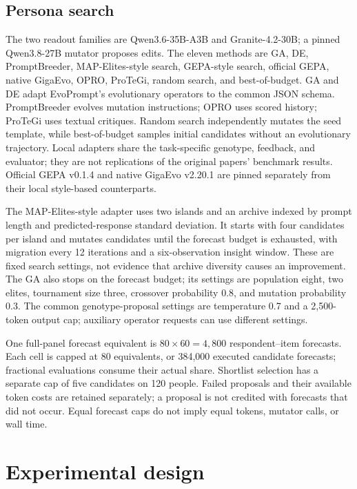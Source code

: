 \documentclass[sigconf,anonymous]{aamas}
\begin{document}
\subsection{Persona search}\label{sec:search}
The two readout families are Qwen3.6-35B-A3B and Granite-4.2-30B; a pinned
Qwen3.8-27B mutator proposes edits. The eleven methods are GA, DE,
PromptBreeder, MAP-Elites-style search, GEPA-style search, official GEPA,
native GigaEvo, OPRO, ProTeGi, random search, and best-of-budget.
GA and DE adapt EvoPrompt's evolutionary operators to the common JSON
schema. PromptBreeder evolves mutation instructions; OPRO uses scored
history; ProTeGi uses textual critiques. Random search independently mutates
the seed template, while best-of-budget samples initial candidates without
an evolutionary trajectory. Local adapters share the task-specific genotype,
feedback, and evaluator; they are not replications of the original papers'
benchmark results. Official GEPA v0.1.4 and native GigaEvo v2.20.1 are
pinned separately from their local style-based counterparts.

The MAP-Elites-style adapter uses two islands and an archive indexed by
prompt length and predicted-response standard deviation. It starts with four
candidates per island and mutates candidates until the forecast budget is
exhausted, with migration every 12 iterations and a six-observation insight
window. These are fixed search settings, not evidence that archive diversity
causes an improvement. The GA also stops on the forecast budget; its settings
are population eight, two elites, tournament
size three, crossover probability 0.8, and mutation probability 0.3.
The common genotype-proposal settings are temperature 0.7 and a 2,500-token
output cap; auxiliary operator requests can use different settings.

One full-panel forecast equivalent is $80\times60=4{,}800$ respondent--item
forecasts. Each cell is capped at 80 equivalents, or 384,000 executed
candidate forecasts; fractional evaluations consume their actual share.
Shortlist selection has a separate cap of five candidates on 120 people.
Failed proposals and their available token costs are retained separately;
a proposal is not credited with forecasts that did not occur. Equal forecast
caps do not imply equal tokens, mutator calls, or wall time.

\section{Experimental design}\label{sec:controls}
\end{document}
